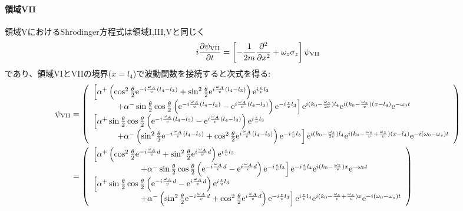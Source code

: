 \paragraph{領域VII}
領域VにおけるShr$\ddot{\mathrm{o}}$dinger方程式は領域I,III,Vと同じく
\begin{equation}
i\frac{\partial \psi_\mathrm{VII}}{\partial t}= \left[-\frac{1}{2m} \frac{\partial^2}{\partial x^2} +\omega_z \sigma_z\right] \psi_\mathrm{VII}
\end{equation}
であり、領域VIとVIIの境界($x=l_4$)で波動関数を接続すると次式を得る:
\begin{align}
\psi_\mathrm{VII} &=\left( \begin{array}{l} \left[\alpha^+ \left(\cos^2\frac{\theta}{2}\mathrm{e}^{-i\frac{\omega_A}{v}(l_4-l_3)} +\sin^2\frac{\theta}{2}\mathrm{e}^{i\frac{\omega_A}{v}(l_4-l_3)} \right)\mathrm{e}^{i\frac{\epsilon}{v}l_3} \right. \\ \hspace{1cm}\left. +\alpha^- \sin\frac{\theta}{2}\cos\frac{\theta}{2} \left(\mathrm{e}^{-i\frac{\omega_A}{v}(l_4-l_3)}-\mathrm{e}^{i\frac{\omega_A}{v}(l_4-l_3)}\right)\mathrm{e}^{-i\frac{\epsilon}{v}l_3}\right]\mathrm{e}^{i(k_0-\frac{\omega_s}{2v})l_4} \mathrm{e}^{i(k_0-\frac{\omega_z}{v})(x-l_4)} \mathrm{e}^{-\omega_0t} \\ \left[\alpha^+ \sin\frac{\theta}{2}\cos\frac{\theta}{2} \left(\mathrm{e}^{-i\frac{\omega_A}{v}(l_4-l_3)}-\mathrm{e}^{i\frac{\omega_A}{v}(l_4-l_3)}\right)\mathrm{e}^{i\frac{\epsilon}{v}l_3} \right. \\ \hspace{1cm} \left. +\alpha^- \left(\sin^2\frac{\theta}{2}\mathrm{e}^{-i\frac{\omega_A}{v}(l_4-l_3)} +\cos^2\frac{\theta}{2}\mathrm{e}^{i\frac{\omega_A}{v}(l_4-l_3)} \right) \mathrm{e}^{-i\frac{\epsilon}{v}l_3}\right] \mathrm{e}^{i(k_0-\frac{\omega_s}{2v})l_4} \mathrm{e}^{i(k_0-\frac{\omega_s}{v}+\frac{\omega_z}{v})(x-l_4)} \mathrm{e}^{-i(\omega_0-\omega_s) t} \end{array}\right) \notag \\
&=\left( \begin{array}{l} \left[\alpha^+ \left(\cos^2\frac{\theta}{2}\mathrm{e}^{-i\frac{\omega_A}{v}d} +\sin^2\frac{\theta}{2}\mathrm{e}^{i\frac{\omega_A}{v}d} \right)\mathrm{e}^{i\frac{\epsilon}{v}l_3} \right. \\ \hspace{2cm}\left. +\alpha^- \sin\frac{\theta}{2}\cos\frac{\theta}{2} \left(\mathrm{e}^{-i\frac{\omega_A}{v}d}-\mathrm{e}^{i\frac{\omega_A}{v}d}\right)\mathrm{e}^{-i\frac{\epsilon}{v}l_3}\right]\mathrm{e}^{-i\frac{\epsilon}{v}l_4}\mathrm{e}^{i(k_0-\frac{\omega_z}{v})x} \mathrm{e}^{-\omega_0t} \\ \left[\alpha^+ \sin\frac{\theta}{2}\cos\frac{\theta}{2} \left(\mathrm{e}^{-i\frac{\omega_A}{v}d}-\mathrm{e}^{i\frac{\omega_A}{v}d}\right)\mathrm{e}^{i\frac{\epsilon}{v}l_3} \right. \\ \hspace{2cm} \left. +\alpha^- \left(\sin^2\frac{\theta}{2}\mathrm{e}^{-i\frac{\omega_A}{v}d} +\cos^2\frac{\theta}{2}\mathrm{e}^{i\frac{\omega_A}{v}d} \right) \mathrm{e}^{-i\frac{\epsilon}{v}l_3}\right] \mathrm{e}^{i\frac{\epsilon}{v}l_4} \mathrm{e}^{i(k_0-\frac{\omega_s}{v}+\frac{\omega_z}{v})x} \mathrm{e}^{-i(\omega_0-\omega_s) t} \end{array}\right)
\end{align}
